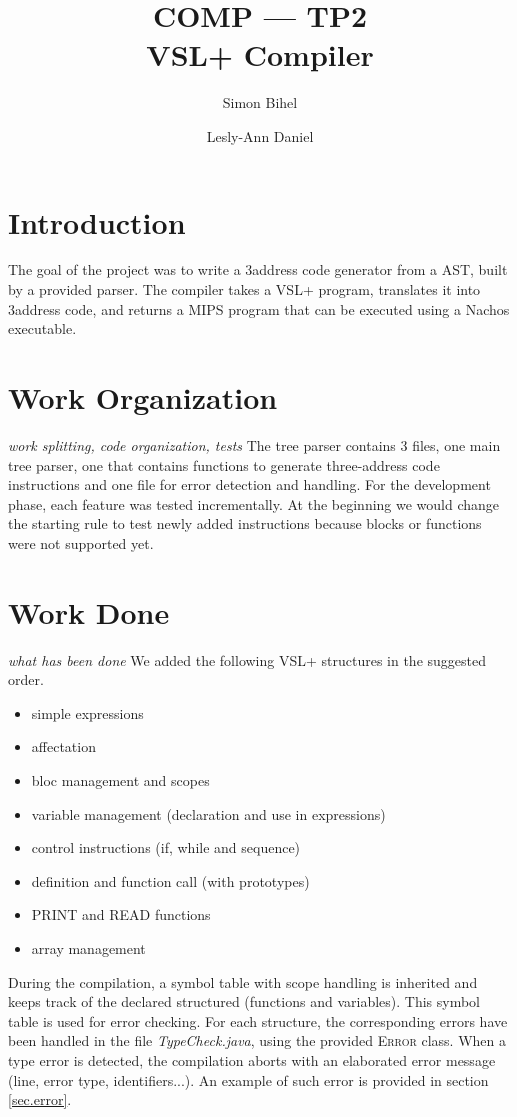 \documentclass[a4paper,11pt,english]{article}
\title{COMP --- TP2\\VSL+ Compiler}
\author{Simon Bihel \and Lesly-Ann Daniel}
\begin{document}
\maketitle

\section{Introduction}
The goal of the project was to write a 3address code generator from a AST, built by a provided parser.
The compiler takes a VSL+ program, translates it into 3address code, and returns a MIPS program that can be executed using a Nachos executable.

\section{Work Organization}
\textit{work splitting, code organization, tests}
The tree parser contains 3 files, one main tree parser, one that contains functions to generate three-address code instructions and one file for error detection and handling.
For the development phase, each feature was tested incrementally.
At the beginning we would change the starting rule to test newly added instructions because blocks or functions were not supported yet.

\section{Work Done}
\textit{what has been done}
We added the following VSL+ structures in the suggested order.
\begin{itemize}
 \item simple expressions
 \item affectation
 \item bloc management and scopes
 \item variable management (declaration and use in expressions)
 \item control instructions (if, while and sequence)
 \item definition and function call (with prototypes)
 \item PRINT and READ functions
 \item array management
\end{itemize}

During the compilation, a symbol table with scope handling is inherited and keeps track of the declared structured (functions and variables).
This symbol table is used for error checking.
For each structure, the corresponding errors have been handled in the file \textit{TypeCheck.java}, using the provided \textsc{Error} class.
When a type error is detected, the compilation aborts with an elaborated error message (line, error type, identifiers...).
An example of such error is provided in section \ref{sec.error}.
\end{document}

